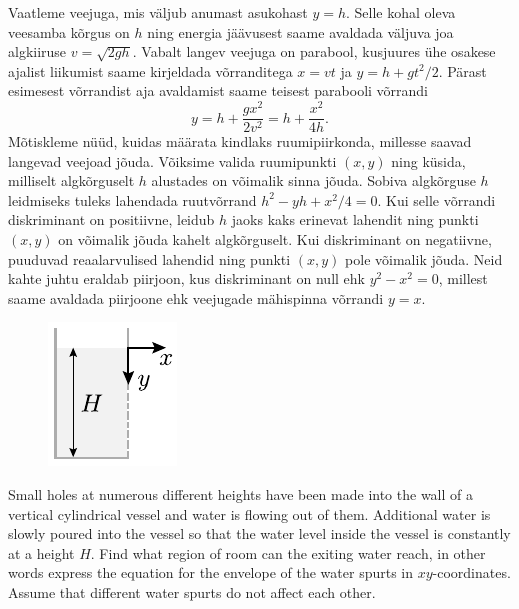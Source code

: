 \solu
Vaatleme veejuga, mis väljub anumast asukohast $y=h$. Selle kohal oleva veesamba kõrgus on $h$ ning energia jäävusest saame avaldada väljuva joa algkiiruse $v=\sqrt{2gh}$. Vabalt langev veejuga on parabool, kusjuures ühe osakese ajalist liikumist saame kirjeldada võrranditega $x=vt$ ja $y=h+gt^2/2$. Pärast esimesest võrrandist aja avaldamist saame teisest parabooli võrrandi
\[
y = h + \frac{gx^2}{2v^2} = h + \frac{x^2}{4h}.
\]
Mõtiskleme nüüd, kuidas määrata kindlaks ruumipiirkonda, millesse saavad langevad veejoad jõuda. Võiksime valida ruumipunkti $(x,y)$ ning küsida, milliselt algkõrguselt $h$ alustades on võimalik sinna jõuda. Sobiva algkõrguse $h$ leidmiseks tuleks lahendada ruutvõrrand $h^2 - yh + x^2/4 = 0$. Kui selle võrrandi diskriminant on positiivne, leidub $h$ jaoks kaks erinevat lahendit ning punkti $(x,y)$ on võimalik jõuda kahelt algkõrguselt. Kui diskriminant on negatiivne, puuduvad reaalarvulised lahendid ning punkti $(x,y)$ pole võimalik jõuda. Neid kahte juhtu eraldab piirjoon, kus diskriminant on null ehk $y^2 - x^2=0$, millest saame avaldada piirjoone ehk veejugade mähispinna võrrandi $y=x$.

\begin{figure}%
\vspace{-15pt}
\includegraphics[width=\linewidth]{2015-lahg-07-veejoadJoon}%
\end{figure}
Small holes at numerous different heights have been made into the wall of a vertical cylindrical vessel and water is flowing out of them. Additional water is slowly poured into the vessel so that the water level inside the vessel is constantly at a height $H$. Find what region of room can the exiting water reach, in other words express the equation for the envelope of the water spurts in $xy$-coordinates. Assume that different water spurts do not affect each other.

